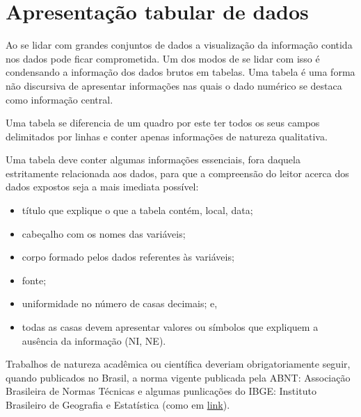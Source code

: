 \documentclass[
]{book}
\providecommand{\tightlist}{%
  \setlength{\itemsep}{0pt}\setlength{\parskip}{0pt}}
\begin{document}
\hypertarget{apresentauxe7uxe3o-tabular-de-dados}{%
\section{Apresentação tabular de dados}\label{apresentauxe7uxe3o-tabular-de-dados}}

\hfill\break

Ao se lidar com grandes conjuntos de dados a visualização da informação contida nos dados pode ficar comprometida. Um dos modos de se lidar com isso é condensando a informação dos dados brutos em tabelas. Uma tabela é uma forma não discursiva de apresentar informações nas quais o dado numérico se destaca como informação central.

\hfill\break

Uma tabela se diferencia de um quadro por este ter todos os seus campos delimitados por linhas e conter apenas informações de natureza qualitativa.

\hfill\break

Uma tabela deve conter algumas informações essenciais, fora daquela estritamente relacionada aos dados, para que a compreensão do leitor acerca dos dados expostos seja a mais imediata possível:

\hfill\break

\begin{itemize}
\tightlist
\item
  título que explique o que a tabela contém, local, data;
\item
  cabeçalho com os nomes das variáveis;
\item
  corpo formado pelos dados referentes às variáveis;
\item
  fonte;
\item
  uniformidade no número de casas decimais; e,
\item
  todas as casas devem apresentar valores ou símbolos que expliquem a ausência da informação (NI, NE).
\end{itemize}

\hfill\break

Trabalhos de natureza acadêmica ou científica deveriam obrigatoriamente seguir, quando publicados no Brasil, a norma vigente publicada pela ABNT: Associação Brasileira de Normas Técnicas e algumas punlicações do IBGE: Instituto Brasileiro de Geografia e Estatística (como em \href{https://biblioteca.ibge.gov.br/visualizacao/livros/liv23907.pdf}{link}).

\hfill\break
\end{document}
